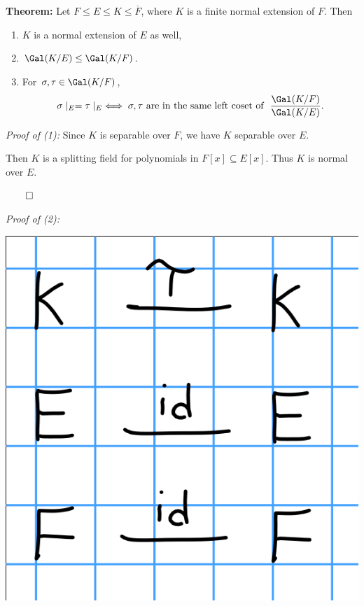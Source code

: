 \textbf{Theorem:} Let \(F \leq E \leq K \leq \overline F\), where \(K\)
is a finite normal extension of \(F\). Then

\begin{enumerate}
\def\labelenumi{\arabic{enumi}.}
\item
  \(K\) is a normal extension of \(E\) as well,
\item
  \(\Gal(K/E) \leq \Gal(K/F)\).
\item
  For \(\sigma, \tau \in \Gal(K/F)\),
  \begin{align*}
  \sigma\mid_E = \tau\mid_E
  \iff
  \sigma, \tau \text{ are in the same left coset of }~
  \frac{\Gal(K/F)}{\Gal(K/E)}
  .\end{align*}
\end{enumerate}

\emph{Proof of (1):} Since \(K\) is separable over \(F\), we have \(K\)
separable over \(E\).

Then \(K\) is a splitting field for polynomials in
\(F[x] \subseteq E[x]\). Thus \(K\) is normal over \(E\).

\(\qed\)

\emph{Proof of (2):}

\includegraphics{figures/2019-10-08-10:35.png}\\

